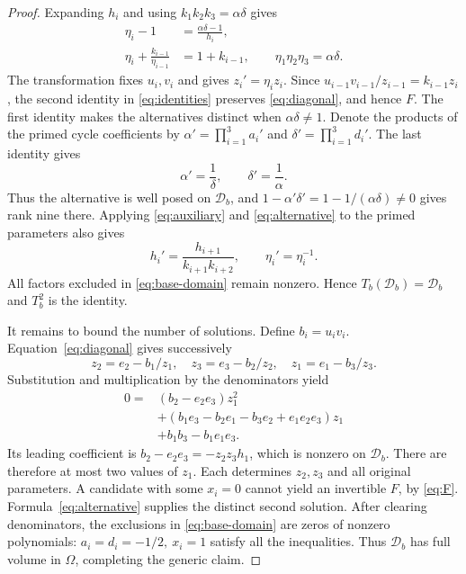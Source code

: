 \documentclass[letterpaper,10pt,conference]{ieeeconf}
\begin{document}
\begin{proof}
Expanding \(h_i\) and using \(k_1k_2k_3=\alpha\delta\) gives
\begin{equation}\label{eq:identities}
\begin{split}
 \eta_i-1&=\frac{\alpha\delta-1}{h_i},\\
 \eta_i+\frac{k_{i-1}}{\eta_{i-1}}&=1+k_{i-1},
 \qquad \eta_1\eta_2\eta_3=\alpha\delta.
\end{split}
\end{equation}
The transformation fixes \(u_i,v_i\) and gives \(z_i'=\eta_i z_i\).
Since \(u_{i-1}v_{i-1}/z_{i-1}=k_{i-1}z_i\), the second identity
in \eqref{eq:identities} preserves \eqref{eq:diagonal}, and hence \(F\).
The first identity makes the alternatives distinct when
\(\alpha\delta\ne1\). Denote the products of the primed cycle
coefficients by \(\alpha'=\prod_{i=1}^3a_i'\) and
\(\delta'=\prod_{i=1}^3d_i'\). The last identity gives
\begin{equation}\label{eq:products}
 \alpha'=\frac1\delta,\qquad \delta'=\frac1\alpha.
\end{equation}
Thus the alternative is well posed on \(\mathcal D_b\), and
\(1-\alpha'\delta'=1-1/(\alpha\delta)\ne0\) gives rank nine there.
Applying \eqref{eq:auxiliary} and \eqref{eq:alternative} to the primed
parameters also gives
\begin{equation}\label{eq:involution}
 h_i'=\frac{h_{i+1}}{k_{i+1}k_{i+2}},\qquad
 \eta_i'=\eta_i^{-1}.
\end{equation}
All factors excluded in \eqref{eq:base-domain} remain nonzero.
Hence \(T_b(\mathcal D_b)=\mathcal D_b\) and \(T_b^2\) is the identity.

It remains to bound the number of solutions. Define \(b_i=u_iv_i\).
Equation~\eqref{eq:diagonal} gives successively
\[
 z_2=e_2-b_1/z_1,\quad
 z_3=e_3-b_2/z_2,\quad z_1=e_1-b_3/z_3.
\]
Substitution and multiplication by the denominators yield
\begin{equation}\label{eq:quadratic}
\begin{split}
0={}&(b_2-e_2e_3)z_1^2\\
 &+(b_1e_3-b_2e_1-b_3e_2+e_1e_2e_3)z_1\\
 &+b_1b_3-b_1e_1e_3.
\end{split}
\end{equation}
Its leading coefficient is \(b_2-e_2e_3=-z_2z_3h_1\), which is
nonzero on \(\mathcal D_b\). There are therefore at most two values
of \(z_1\). Each determines \(z_2,z_3\) and all original
parameters. A candidate with some \(x_i=0\) cannot yield an
invertible \(F\), by \eqref{eq:F}.
Formula~\eqref{eq:alternative} supplies the distinct second solution.
After clearing denominators, the exclusions in \eqref{eq:base-domain}
are zeros of nonzero polynomials: \(a_i=d_i=-1/2,\ x_i=1\) satisfy
all the inequalities. Thus \(\mathcal D_b\) has full volume in
\(\Omega\), completing the generic claim.
\end{proof}
\end{document}
